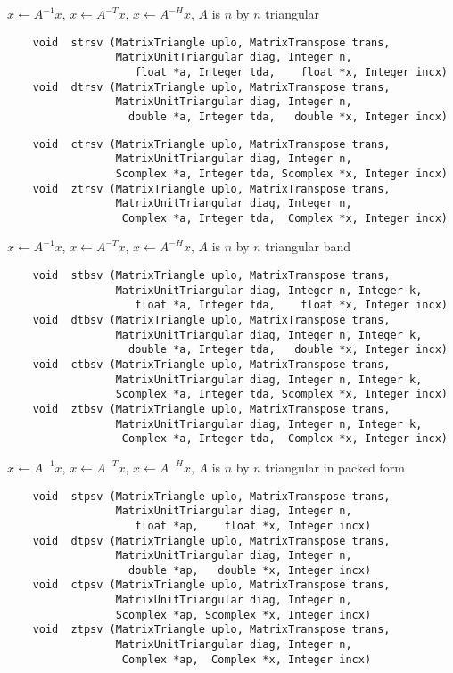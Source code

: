 \normalsize
$x \leftarrow A^{-1} x$, $x \leftarrow A^{-T} x$,
$x \leftarrow A^{-H} x$, $A$ is $n$ by $n$ triangular
\footnotesize
\begin{verbatim}
    void  strsv (MatrixTriangle uplo, MatrixTranspose trans,
                 MatrixUnitTriangular diag, Integer n,
                    float *a, Integer tda,    float *x, Integer incx)
    void  dtrsv (MatrixTriangle uplo, MatrixTranspose trans,
                 MatrixUnitTriangular diag, Integer n,
                   double *a, Integer tda,   double *x, Integer incx)
\end{verbatim}
\newpage
\begin{verbatim}
    void  ctrsv (MatrixTriangle uplo, MatrixTranspose trans,
                 MatrixUnitTriangular diag, Integer n,
                 Scomplex *a, Integer tda, Scomplex *x, Integer incx)
    void  ztrsv (MatrixTriangle uplo, MatrixTranspose trans,
                 MatrixUnitTriangular diag, Integer n,
                  Complex *a, Integer tda,  Complex *x, Integer incx) 
\end{verbatim}
\normalsize
$x \leftarrow A^{-1} x$, $x \leftarrow A^{-T} x$, $x \leftarrow A^{-H} x$, 
$A$ is $n$ by $n$ triangular band
\footnotesize
\begin{verbatim}
    void  stbsv (MatrixTriangle uplo, MatrixTranspose trans,
                 MatrixUnitTriangular diag, Integer n, Integer k,
                    float *a, Integer tda,    float *x, Integer incx)
    void  dtbsv (MatrixTriangle uplo, MatrixTranspose trans,
                 MatrixUnitTriangular diag, Integer n, Integer k,
                   double *a, Integer tda,   double *x, Integer incx)
    void  ctbsv (MatrixTriangle uplo, MatrixTranspose trans,
                 MatrixUnitTriangular diag, Integer n, Integer k,
                 Scomplex *a, Integer tda, Scomplex *x, Integer incx)
    void  ztbsv (MatrixTriangle uplo, MatrixTranspose trans,
                 MatrixUnitTriangular diag, Integer n, Integer k,
                  Complex *a, Integer tda,  Complex *x, Integer incx)
\end{verbatim}
\normalsize
$x \leftarrow A^{-1} x$, $x \leftarrow A^{-T} x$, $x \leftarrow A^{-H} x$, 
$A$ is $n$ by $n$ triangular in packed form
\footnotesize
\begin{verbatim}
    void  stpsv (MatrixTriangle uplo, MatrixTranspose trans,
                 MatrixUnitTriangular diag, Integer n,
                    float *ap,    float *x, Integer incx)
    void  dtpsv (MatrixTriangle uplo, MatrixTranspose trans,
                 MatrixUnitTriangular diag, Integer n,
                   double *ap,   double *x, Integer incx)
    void  ctpsv (MatrixTriangle uplo, MatrixTranspose trans,
                 MatrixUnitTriangular diag, Integer n,
                 Scomplex *ap, Scomplex *x, Integer incx)
    void  ztpsv (MatrixTriangle uplo, MatrixTranspose trans,
                 MatrixUnitTriangular diag, Integer n,
                  Complex *ap,  Complex *x, Integer incx)
\end{verbatim}
